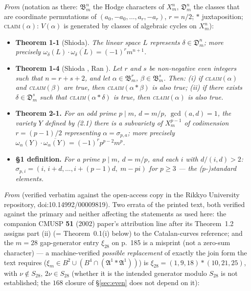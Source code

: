\documentclass[11pt]{amsart}
\theoremstyle{remark}
\newcommand{\V}{V}
\begin{document}
\emph{From \cite{Aoki87}} (notation as there: $\mathfrak B^n_m$ the Hodge characters of $X^n_m$,
$\mathfrak D^n_m$ the classes that are coordinate permutations of $(a_0,-a_0,\dots,a_r,-a_r)$,
$r=n/2$; $*$ juxtaposition; \textsc{claim}$(\alpha)$: $\V(\alpha)$ is generated by classes of
algebraic cycles on $X^n_m$):

\begin{itemize}
\item[--] \textbf{Theorem 1-1} (Shioda). \emph{The linear space $L$ represents
$\delta\in\mathfrak D^n_m$; more precisely
$\omega_\delta(L)\cdot\overline{\omega_\delta(L)}=(-1)^r m^{n+1}$.}
\item[--] \textbf{Theorem 1-4} (Shioda \cite{Shioda79}, Ran \cite{Ran}). \emph{Let $r$ and $s$ be non-negative even integers
such that $n=r+s+2$, and let $\alpha\in\mathfrak B^r_m$, $\beta\in\mathfrak B^s_m$. Then:
(i) if \textup{\textsc{claim}}$(\alpha)$ and \textup{\textsc{claim}}$(\beta)$ are true, then
\textup{\textsc{claim}}$(\alpha*\beta)$ is also true; (ii) if there exists $\delta\in\mathfrak D^s_m$ such
that \textup{\textsc{claim}}$(\alpha*\delta)$ is true, then \textup{\textsc{claim}}$(\alpha)$ is also true.}
\item[--] \textbf{Theorem 2-1.} \emph{For an odd prime $p\mid m$, $d=m/p$, $\gcd(a,d)=1$, the
variety $Y$ defined by (2.1) there is a subvariety of $X^{p-1}_m$ of codimension $r=(p-1)/2$
representing $\alpha=\sigma_{p,a}$; more precisely
$\omega_\alpha(Y)\cdot\overline{\omega_\alpha(Y)}=(-1)^r p^{p-2}m^p$.}
\item[--] \textbf{\S1 definition.} \emph{For a prime $p\mid m$, $d=m/p$, and each $i$ with
$d/(i,d)>2$: $\sigma_{p,i}=(i,\,i+d,\dots,i+(p-1)d,\;m-pi)$ for $p\ge3$ --- the ($p$-)standard
elements.}
\end{itemize}

\emph{From \cite{Aoki00}} (verified verbatim against the open-access copy in the Rikkyo
University repository, doi:10.14992/00009819). Two errata of the printed text, both verified
against the primary and neither affecting the statements as used here: the companion CMUSP
\textbf{51} (2002) paper's attribution line after its Theorem~1.2 assigns part (ii)
(= Theorem~0.1(i) below) to the Catalan-curves reference; and the $m=28$ gap-generator entry
$\xi_{28}$ on p.~185 is a misprint (not a zero-sum character) --- a machine-verified
\emph{possible replacement} of exactly the join form the text requires
($\xi_m\in B^2\cup(B^4\cap(\mathfrak A^1*\mathfrak A^1))$) is
$\xi_{28}=(1,9,18)*(10,21,25)$, with $\nu\notin S_{28}$, $2\nu\in S_{28}$ (whether it is the
intended generator modulo $S_{28}$ is not established; the $168$ closure of \S\ref{sec:even}
does not depend on it):
\end{document}
